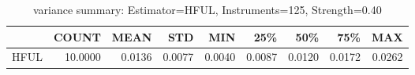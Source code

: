 \begin{table}[ht]
\centering
\caption{variance summary: Estimator=HFUL, Instruments=125, Strength=0.40}
\begin{tabular}{lrrrrrrrr}
\toprule
 & COUNT & MEAN & STD & MIN & 25\% & 50\% & 75\% & MAX \\
\midrule
HFUL & 10.0000 & 0.0136 & 0.0077 & 0.0040 & 0.0087 & 0.0120 & 0.0172 & 0.0262 \\
\bottomrule
\end{tabular}
\end{table}
